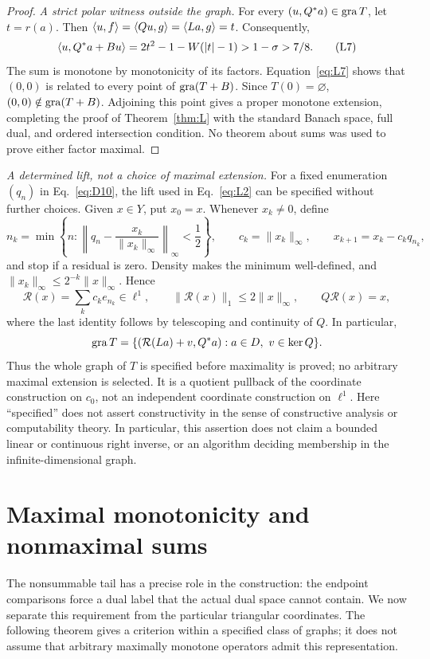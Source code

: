\begin{proof}
\noindent\textit{A strict polar witness outside the graph.}
\label{sec:L5}
For every $(u,Q^*a)\in\operatorname{gra} T$, let $t=r(a)$. Then
$\langle u,f\rangle=\langle Qu,g\rangle=\langle La,g\rangle=t$.
Consequently,
\begin{equation}
\langle u,Q^*a+Bu\rangle
 =2t^2-1-W(|t|-1)>1-\sigma>7/8.
\tag{L7}\label{eq:L7}
\end{equation}
The sum is monotone by monotonicity of its factors.
Equation~\eqref{eq:L7} shows that $(0,0)$ is related to every point of $\operatorname{gra}(T+B)$.
Since $T(0)=\varnothing$, $(0,0)\notin\operatorname{gra}(T+B)$. Adjoining this point
gives a proper monotone extension, completing the proof of
Theorem~\ref{thm:L} with the standard Banach space, full dual, and ordered
intersection condition. No theorem about sums was used to prove either
factor maximal.
\end{proof}

\noindent\textit{A determined lift, not a choice of maximal extension.}
For a fixed enumeration $(q_n)$ in Eq.~\eqref{eq:D10}, the lift used in
Eq.~\eqref{eq:L2} can be specified without further choices. Given $x\in Y$,
put $x_0=x$. Whenever $x_k\ne0$, define
\[
n_k=\min\left\{n:\left\|q_n-\frac{x_k}{\|x_k\|_\infty}\right\|_\infty
 <\frac12\right\},\qquad
c_k=\|x_k\|_\infty,\qquad x_{k+1}=x_k-c_kq_{n_k},
\]
and stop if a residual is zero. Density makes the minimum well-defined,
and $\|x_k\|_\infty\le2^{-k}\|x\|_\infty$. Hence
\[
\mathcal R(x)=\sum_k c_ke_{n_k}\in\ell^1,\qquad
\|\mathcal R(x)\|_1\le2\|x\|_\infty,\qquad
Q\mathcal R(x)=x,
\]
where the last identity follows by telescoping and continuity of $Q$.
In particular,
\[
\operatorname{gra} T=\{(\mathcal R(La)+v,Q^*a):a\in D,\ v\in\ker Q\}.
\]
Thus the whole graph of $T$ is specified before maximality is proved;
no arbitrary maximal extension is selected. It is a quotient pullback of
the coordinate construction on $c_0$, not an independent coordinate
construction on $\ell^1$. Here ``specified'' does not assert constructivity
in the sense of constructive analysis or computability theory. In particular,
this assertion does not
claim a bounded linear or continuous right inverse, or an algorithm
deciding membership in the infinite-dimensional graph.


\section{Maximal monotonicity and nonmaximal sums}
\label{sec:endpoint-criterion}
The nonsummable tail has a precise role in the construction: the endpoint
comparisons force a dual label that the actual dual space cannot contain.
We now separate this requirement from the particular triangular coordinates.
The following theorem gives a criterion within a specified class of graphs;
it does not assume that arbitrary maximally monotone operators admit this
representation.

